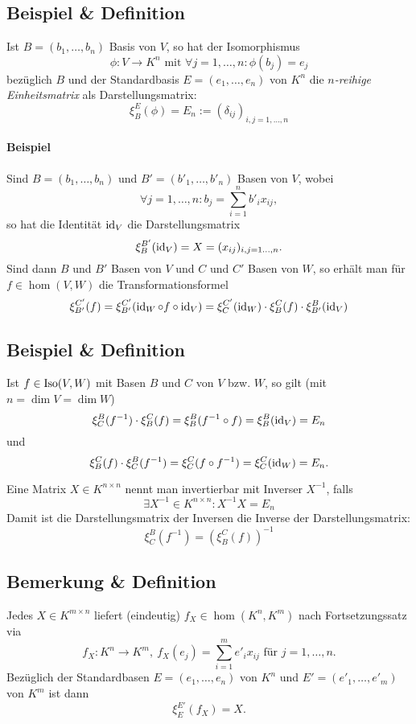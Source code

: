 \subsection{Beispiel \& Definition}
	\begin{Definition}[Einheitsmatrix]
		Ist $ B=(b_1,\dots,b_n) $ Basis von $ V $, so hat der Isomorphismus
		\[
			\phi:V\to K^n \text{ mit } \forall j=1,\dots,n:\phi(b_j)=e_j
		\]
		bezüglich $ B $ und der Standardbasis $ E = (e_1,\dots,e_n) $ von $ K^n $ die \emph{$ n $-reihige Einheitsmatrix} als Darstellungsmatrix:
		\[
			\xi_B^E(\phi) = E_n := (\delta_{ij})_{i,j = 1,\dots,n}
		\]
	\end{Definition}
	\paragraph{Beispiel}
		Sind $ B=(b_1,\dots,b_n) $ und $ B'=(b'_1,\dots,b'_n) $ Basen von $ V $, wobei
		\[
			\forall j=1,\dots,n:b_j = \sum_{i=1}^{n}b'_ix_{ij},
		\]
		so hat die Identität $ \operatorname{id}_V $ die Darstellungsmatrix
		\[
			\xi_B^{B'}(\operatorname{id}_V)= X = (x_{ij})_{i,j=1\dots,n}.
		\]
		Sind dann $ B $ und $ B' $ Basen von $ V $ und $ C $ und $ C' $ Basen von $ W $, so erhält man für $ f\in\hom(V,W) $ die Transformationsformel
		\[
			\xi_{B'}^{C'}(f) = \xi_{B'}^{C'}(\operatorname{id}_W\circ f\circ \operatorname{id}_V) = \xi_C^{C'}(\operatorname{id}_W)\cdot \xi_B^C(f)\cdot \xi_{B'}^{B}(\operatorname{id}_V)
		\]
\subsection{Beispiel \& Definition}
	Ist $ f\in \operatorname{Iso}(V,W) $ mit Basen $ B $ und $ C $ von $ V $ bzw. $ W $, so gilt (mit $ n=\dim V = \dim W $)
	\[
		\xi_C^B(f^{-1})\cdot \xi_B^C(f) = \xi_B^B(f^{-1}\circ f) = \xi_B^B(\operatorname{id}_V) = E_n
	\]
	und
	\[
		\xi_B^C(f)\cdot \xi_C^B(f^{-1})=\xi_C^C(f\circ f^{-1}) = \xi_C^C(\operatorname{id}_W)=E_n.
	\]

	\begin{Definition}
		Eine Matrix $ X\in K^{n\times n} $ nennt man invertierbar mit Inverser $ X^{-1} $, falls
		\[
			\exists X^{-1}\in K^{n\times n}:X^{-1}X = E_n
		\]
		Damit ist die Darstellungsmatrix der Inversen die Inverse der Darstellungsmatrix:
		\[
			\xi_C^B(f^{-1}) = (\xi_B^C(f))^{-1}
		\]
	\end{Definition}
\subsection{Bemerkung \& Definition}
	Jedes $ X\in K^{m\times n} $ liefert (eindeutig) $ f_X\in \hom(K^n,K^m) $ nach Fortsetzungssatz via
	\[
		f_X:K^n\to K^m,\ f_X(e_j) = \sum_{i=1}^{m} e'_ix_{ij} \text{ für } j=1,\dots,n.
	\]
	Bezüglich der Standardbasen $ E = (e_1,\dots,e_n) $ von $ K^n $ und $ E'=(e'_1,\dots,e'_m) $ von $ K^m $ ist dann
	\[
		\xi_E^{E'}(f_X) = X.
	\]

